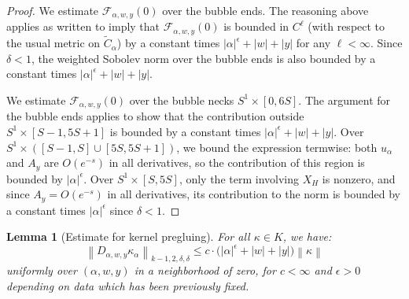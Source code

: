\documentclass[12pt]{article}
\newtheorem{lemma}[theorem]{Lemma}
\theoremstyle{definition}
\theoremstyle{remark}
\numberwithin{equation}{subsection}
\newcommand{\F}{\mathcal F}
\begin{document}
\begin{proof}
We estimate $\F_{\alpha,w,y}(0)$ over the bubble ends.  The reasoning above applies as written to imply that $\F_{\alpha,w,y}(0)$ is bounded in $C^\ell$ (with respect to the usual metric on $\tilde C_\alpha$) by a constant times $\left|\alpha\right|^\epsilon+\left|w\right|+\left|y\right|$ for any $\ell<\infty$.  Since $\delta<1$, the weighted Sobolev norm over the bubble ends is also bounded by a constant times $\left|\alpha\right|^\epsilon+\left|w\right|+\left|y\right|$.

We estimate $\F_{\alpha,w,y}(0)$ over the bubble necks $S^1\times[0,6S]$.  The argument for the bubble ends applies to show that the contribution outside $S^1\times[S-1,5S+1]$ is bounded by a constant times $\left|\alpha\right|^\epsilon+\left|w\right|+\left|y\right|$.  Over $S^1\times([S-1,S]\cup[5S,5S+1])$, we bound the expression termwise: both $u_\alpha$ and $A_y$ are $O(e^{-s})$ in all derivatives, so the contribution of this region is bounded by $\left|\alpha\right|^\epsilon$.  Over $S^1\times[S,5S]$, only the term involving $X_H$ is nonzero, and since $A_y=O(e^{-s})$ in all derivatives, its contribution to the norm is bounded by a constant times $\left|\alpha\right|^\epsilon$ since $\delta<1$.
\end{proof}

\begin{lemma}[Estimate for kernel pregluing]\label{pregluingKestimateHF}
For all $\kappa\in K$, we have:
\begin{equation}
\left\|D_{\alpha,w,y}\kappa_\alpha\right\|_{k-1,2,\delta,\delta}\leq c\cdot\bigl(\left|\alpha\right|^\epsilon+\left|w\right|+\left|y\right|\bigr)\left\|\kappa\right\|
\end{equation}
uniformly over $(\alpha,w,y)$ in a neighborhood of zero, for $c<\infty$ and $\epsilon>0$ depending on data which has been previously fixed.
\end{lemma}
\end{document}
